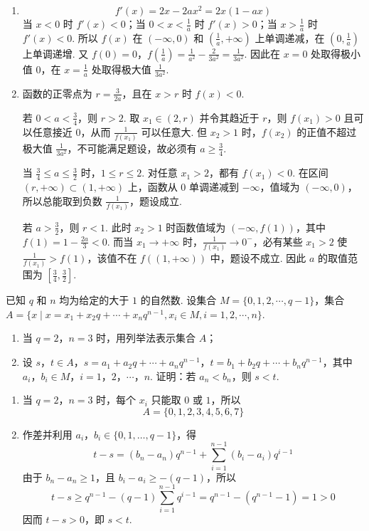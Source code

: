 \begin{solution}
\begin{enumerate}
\item
\[
f'(x)=2x-2ax^2=2x(1-ax)
\]
当 \(x<0\) 时 \(f'(x)<0\)；当 \(0<x<\frac1a\) 时 \(f'(x)>0\)；当 \(x>\frac1a\) 时 \(f'(x)<0\). 所以 \(f(x)\) 在 \((-\infty,0)\) 和 \(\left(\frac1a,+\infty\right)\) 上单调递减，在 \(\left(0,\frac1a\right)\) 上单调递增. 又
\(f(0)=0\)，\(f\left(\frac1a\right)=\frac1{a^2}-\frac{2}{3a^2}=\frac1{3a^2}\).
因此在 \(x=0\) 处取得极小值 \(0\)，在 \(x=\frac1a\) 处取得极大值 \(\frac1{3a^2}\).
\item 函数的正零点为 \(r=\frac{3}{2a}\)，且在 \(x>r\) 时 \(f(x)<0\).

若 \(0<a<\frac34\)，则 \(r>2\). 取 \(x_1\in(2,r)\) 并令其趋近于 \(r\)，则 \(f(x_1)>0\) 且可以任意接近 \(0\)，从而 \(\frac{1}{f(x_1)}\) 可以任意大. 但 \(x_2>1\) 时，\(f(x_2)\) 的正值不超过极大值 \(\frac1{3a^2}\)，不可能满足题设，故必须有 \(a\geqslant\frac34\).

当 \(\frac34\leqslant a\leqslant\frac32\) 时，\(1\leqslant r\leqslant2\). 对任意 \(x_1>2\)，都有 \(f(x_1)<0\). 在区间 \((r,+\infty)\subset(1,+\infty)\) 上，函数从 \(0\) 单调递减到 \(-\infty\)，值域为 \((-\infty,0)\)，所以总能取到负数 \(\frac{1}{f(x_1)}\)，题设成立.

若 \(a>\frac32\)，则 \(r<1\). 此时 \(x_2>1\) 时函数值域为 \((-\infty,f(1))\)，其中 \(f(1)=1-\frac{2a}{3}<0\). 而当 \(x_1\to+\infty\) 时，\(\frac{1}{f(x_1)}\to0^{-}\)，必有某些 \(x_1>2\) 使 \(\frac{1}{f(x_1)}>f(1)\)，该值不在 \(f((1,+\infty))\) 中，题设不成立. 因此 \(a\) 的取值范围为 \(\left[\frac34,\frac32\right]\).
\end{enumerate}
\end{solution}

\begin{problem}
已知 \(q\) 和 \(n\) 均为给定的大于 \(1\) 的自然数. 设集合 \(M = \{0, 1, 2, \cdots, q-1\}\)，集合 \(A = \{x \mid x = x_1 + x_2q + \cdots + x_nq^{n-1}, x_i \in M, i = 1, 2, \cdots, n\}\).

\begin{enumerate}
\item 当 \(q = 2\)，\(n = 3\) 时，用列举法表示集合 \(A\)；
\item 设 \(s\)，\(t \in A\)，\(s = a_1 + a_2q + \cdots + a_nq^{n-1}\)，\(t = b_1 + b_2q + \cdots + b_nq^{n-1}\)，其中 \(a_i\)，\(b_i \in M\)，\(i = 1\)，\(2\)，\(\cdots\)，\(n\). 证明：若 \(a_n < b_n\)，则 \(s < t\).
\end{enumerate}
\end{problem}

\begin{solution}
\begin{enumerate}
\item 当 \(q=2\)，\(n=3\) 时，每个 \(x_i\) 只能取 \(0\) 或 \(1\)，所以
\[
A=\{0,1,2,3,4,5,6,7\}
\]
\item 作差并利用 \(a_i\)，\(b_i\in\{0,1,\ldots,q-1\}\)，得
\[
t-s
=(b_n-a_n)q^{n-1}+\sum_{i=1}^{n-1}(b_i-a_i)q^{i-1}
\]
由于 \(b_n-a_n\geqslant1\)，且 \(b_i-a_i\geqslant-(q-1)\)，所以
\[
t-s\geqslant q^{n-1}-(q-1)\sum_{i=1}^{n-1}q^{i-1}=q^{n-1}-(q^{n-1}-1)=1>0
\]
因而 \(t-s>0\)，即 \(s<t\).
\end{enumerate}
\end{solution}
